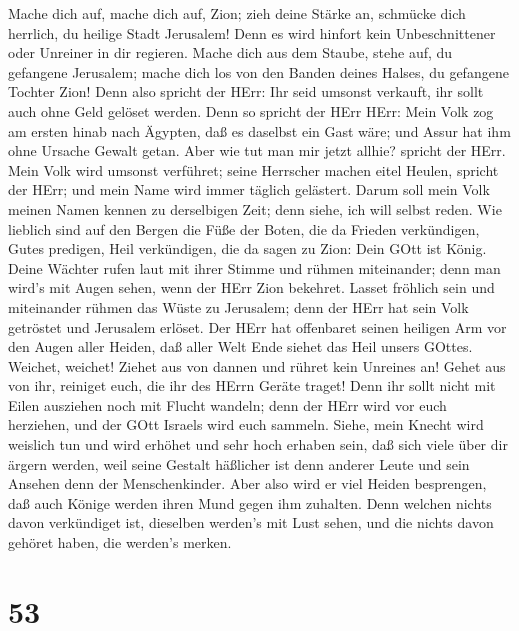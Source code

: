  Mache dich auf, mache dich auf, Zion; zieh deine Stärke an,
schmücke dich herrlich, du heilige Stadt Jerusalem! Denn es wird hinfort
kein Unbeschnittener oder Unreiner in dir regieren.  Mache
dich aus dem Staube, stehe auf, du gefangene Jerusalem; mache dich los
von den Banden deines Halses, du gefangene Tochter Zion! 
Denn also spricht der HErr: Ihr seid umsonst verkauft, ihr sollt auch
ohne Geld gelöset werden.  Denn so spricht der HErr HErr:
Mein Volk zog am ersten hinab nach Ägypten, daß es daselbst ein Gast
wäre; und Assur hat ihm ohne Ursache Gewalt getan.  Aber wie
tut man mir jetzt allhie? spricht der HErr. Mein Volk wird umsonst
verführet; seine Herrscher machen eitel Heulen, spricht der HErr; und
mein Name wird immer täglich gelästert.  Darum soll mein
Volk meinen Namen kennen zu derselbigen Zeit; denn siehe, ich will
selbst reden.  Wie lieblich sind auf den Bergen die Füße der
Boten, die da Frieden verkündigen, Gutes predigen, Heil verkündigen, die
da sagen zu Zion: Dein GOtt ist König.  Deine Wächter rufen
laut mit ihrer Stimme und rühmen miteinander; denn man wird's mit Augen
sehen, wenn der HErr Zion bekehret.  Lasset fröhlich sein
und miteinander rühmen das Wüste zu Jerusalem; denn der HErr hat sein
Volk getröstet und Jerusalem erlöset.  Der HErr hat
offenbaret seinen heiligen Arm vor den Augen aller Heiden, daß aller
Welt Ende siehet das Heil unsers GOttes.  Weichet, weichet!
Ziehet aus von dannen und rühret kein Unreines an! Gehet aus von ihr,
reiniget euch, die ihr des HErrn Geräte traget!  Denn ihr
sollt nicht mit Eilen ausziehen noch mit Flucht wandeln; denn der HErr
wird vor euch herziehen, und der GOtt Israels wird euch sammeln.
 Siehe, mein Knecht wird weislich tun und wird erhöhet und
sehr hoch erhaben sein,  daß sich viele über dir ärgern
werden, weil seine Gestalt häßlicher ist denn anderer Leute und sein
Ansehen denn der Menschenkinder.  Aber also wird er viel
Heiden besprengen, daß auch Könige werden ihren Mund gegen ihm zuhalten.
Denn welchen nichts davon verkündiget ist, dieselben werden's mit Lust
sehen, und die nichts davon gehöret haben, die werden's merken.

\hypertarget{section-52}{%
\section{53}\label{section-52}}


